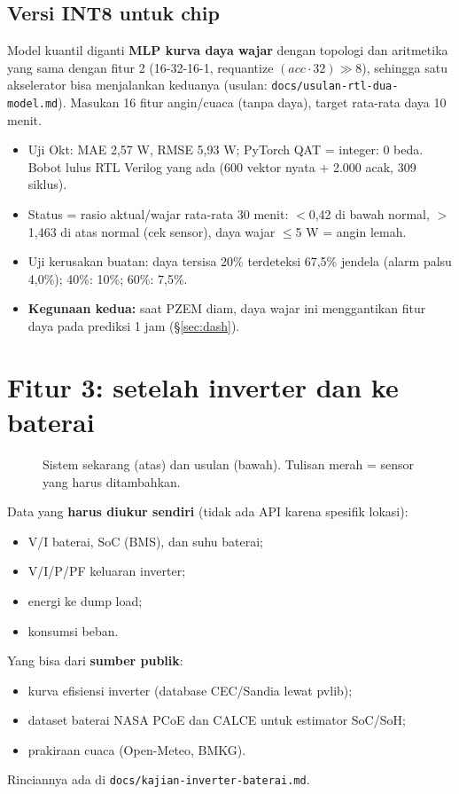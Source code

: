 \documentclass[10.5pt,a4paper]{article}
\newcommand{\diagram}[1]{}
\newcommand{\cmd}[1]{\texttt{#1}}
\begin{document}
\subsection{Versi INT8 untuk chip}\label{sec:f1int8}
Model kuantil diganti \textbf{MLP kurva daya wajar} dengan topologi dan aritmetika yang sama dengan fitur 2 (16-32-16-1, requantize $(acc\cdot32)\gg8$),
sehingga satu akselerator bisa menjalankan keduanya (usulan: \cmd{docs/usulan-rtl-dua-model.md}). Masukan 16 fitur angin/cuaca (tanpa daya), target rata-rata daya 10 menit.
\begin{itemize}
  \item Uji Okt: MAE 2,57 W, RMSE 5,93 W; PyTorch QAT = integer: 0 beda. Bobot lulus RTL Verilog yang ada (600 vektor nyata + 2.000 acak, 309 siklus).
  \item Status = rasio aktual/wajar rata-rata 30 menit: $<$0,42 di bawah normal, $>$1,463 di atas normal (cek sensor), daya wajar $\le$5 W = angin lemah.
  \item Uji kerusakan buatan: daya tersisa 20\% terdeteksi 67,5\% jendela (alarm palsu 4,0\%); 40\%: 10\%; 60\%: 7,5\%.
  \item \textbf{Kegunaan kedua:} saat PZEM diam, daya wajar ini menggantikan fitur daya pada prediksi 1 jam (\S\ref{sec:dash}).
\end{itemize}

\section{Fitur 3: setelah inverter dan ke baterai}
\begin{figure}[h]
\centering\resizebox{0.85\linewidth}{!}{\diagram{baterai}}
\caption{Sistem sekarang (atas) dan usulan (bawah). Tulisan merah = sensor yang harus ditambahkan.}
\end{figure}
Data yang \textbf{harus diukur sendiri} (tidak ada API karena spesifik lokasi):
\begin{itemize}
  \item V/I baterai, SoC (BMS), dan suhu baterai;
  \item V/I/P/PF keluaran inverter;
  \item energi ke dump load;
  \item konsumsi beban.
\end{itemize}
Yang bisa dari \textbf{sumber publik}:
\begin{itemize}
  \item kurva efisiensi inverter (database CEC/Sandia lewat pvlib);
  \item dataset baterai NASA PCoE dan CALCE untuk estimator SoC/SoH;
  \item prakiraan cuaca (Open-Meteo, BMKG).
\end{itemize}
Rinciannya ada di \cmd{docs/kajian-inverter-baterai.md}.
\end{document}
